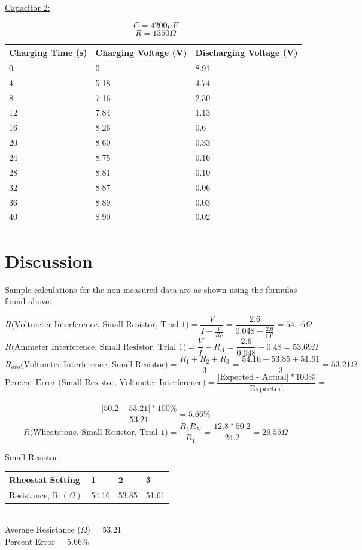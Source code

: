 \documentclass[11pt, titlepage]{article}
\begin{document}
\underline{Capacitor 2:}
\begin{center}
$$C = 4200 \mu F$$
$$R = 1350 \Omega$$
\begin{tabular}
{|m{9em}|m{9em}|m{9em}|}
\hline
Charging Time (s) & Charging Voltage (V) & Discharging Voltage (V) \\
\hline
0 & 0 & 8.91\\
\hline
4 & 5.18 & 4.74\\
\hline
8 & 7.16 & 2.30\\
\hline
12 & 7.84 & 1.13\\
\hline
16 & 8.26 & 0.6\\
\hline
20 & 8.60 & 0.33\\
\hline
24 & 8.75 & 0.16\\
\hline
28 & 8.81 & 0.10\\
\hline
32 & 8.87 & 0.06\\
\hline
36 & 8.89 & 0.03\\
\hline
40 & 8.90 & 0.02\\
\hline
\end{tabular}
\end{center}

\section*{Discussion}
Sample calculations for the non-measured data are as shown using the formulas found above:

$$R \text{(Voltmeter Interference, Small Resistor, Trial 1)} = \frac{V}{I - \frac{V}{R_V}} = \frac{2.6}{0.048 - \frac{2.6}{10^7}} = 54.16 \Omega$$
$$R \text{(Ammeter Interference, Small Resistor, Trial 1)} = \frac{V}{I} - R_A = \frac{2.6}{0.048} - 0.48 = 53.69 \Omega$$
$$R_{avg} \text{(Voltmeter Interference, Small Resistor)} = \frac{R_1 + R_2 + R_3}{3} = \frac{54.16 + 53.85 + 51.61}{3} = 53.21 \Omega$$
$$\text{Percent Error (Small Resistor, Voltmeter Interference)} = \frac{\text{$|$Expected - Actual$|$} * 100\%}{\text{Expected}} =$$\\$$\frac{|50.2 - 53.21| * 100\%}{53.21} = 5.66\%$$
$$R \text{(Wheatstone, Small Resistor, Trial 1)} = \frac{R_2R_K}{R_1} = \frac{12.8*50.2}{24.2} = 26.55 \Omega$$

\underline{Small Resistor:}
\begin{center}
\begin{tabular}
{|m{9em}|m{7em}|m{7em}|m{7em}|}
\hline
Rheostat Setting & 1 & 2 & 3 \\
\hline
Resistance, R $(\Omega)$ & 54.16 & 53.85 & 51.61\\
\hline
\end{tabular}
\\Average Resistance ($\Omega$) = 53.21
\\Percent Error = 5.66\%
\end{center}
\end{document}
